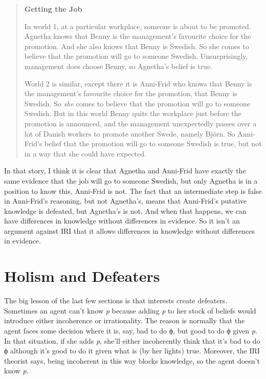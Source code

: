 \documentclass[
  11pt,
  letterpaper,
  DIV=11,
  numbers=noendperiod,
  twoside]{scrartcl}
\begin{document}
\begin{quote}
\textbf{Getting the Job}

In world 1, at a particular workplace, someone is about to be promoted.
Agnetha knows that Benny is the management's favourite choice for the
promotion. And she also knows that Benny is Swedish. So she comes to
believe that the promotion will go to someone Swedish. Unsurprisingly,
management does choose Benny, so Agnetha's belief is true.

World 2 is similar, except there it is Anni-Frid who knows that Benny is
the management's favourite choice for the promotion, that Benny is
Swedish. So \emph{she} comes to believe that the promotion will go to
someone Swedish. But in this world Benny quits the workplace just before
the promotion is announced, and the management unexpectedly passes over
a lot of Danish workers to promote another Swede, namely Björn. So
Anni-Frid's belief that the promotion will go to someone Swedish is
true, but not in a way that she could have expected.
\end{quote}

In that story, I think it is clear that Agnetha and Anni-Frid have
exactly the same evidence that the job will go to someone Swedish, but
only Agnetha is in a position to know this, Anni-Frid is not. The fact
that an intermediate step is false in Anni-Frid's reasoning, but not
Agnetha's, means that Anni-Frid's putative knowledge is defeated, but
Agnetha's is not. And when that happens, we can have differences in
knowledge without differences in evidence. So it isn't an argument
against IRI that it allows differences in knowledge without differences
in evidence.

\section{Holism and Defeaters}\label{sect:holism}

The big lesson of the last few sections is that interests create
defeaters. Sometimes an agent can't know \emph{p} because adding
\emph{p} to her stock of beliefs would introduce either incoherence or
irrationality. The reason is normally that the agent faces some decision
where it is, say, bad to do ϕ, but good to do ϕ given \emph{p}. In that
situation, if she adds \emph{p}, she'll either incoherently think that
it's bad to do ϕ although it's good to do it given what is (by her
lights) true. Moreover, the IRI theorist says, being incoherent in this
way blocks knowledge, so the agent doesn't know \emph{p}.
\end{document}
